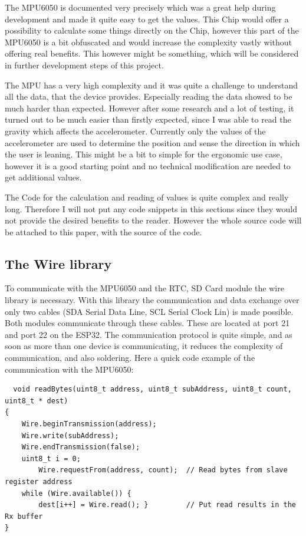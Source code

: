The MPU6050 is documented very precisely which was a great help during development and made it quite easy to get the values. This Chip would offer a possibility to calculate some things directly on the Chip, however this part of the MPU6050 is a bit obfuscated and would increase the complexity vastly without offering real benefits. This however might be something, which will be considered in further development steps of this project.

The MPU has a very high complexity and it was quite a challenge to understand all the data, that the device provides. Especially reading the data showed to be much harder than expected. However after some research and a lot of testing, it turned out to be much easier than firstly expected, since I was able to read the gravity which affects the accelerometer.
Currently only the values of the accelerometer are used to determine the position and sense the direction in which the user is leaning. This might be a bit to simple for the ergonomic use case, however it is a good starting point and no technical modification are needed to get additional values.

The Code for the calculation and reading of values is quite complex and really long. Therefore I will not put any code snippets in this sections since they would not provide the desired benefits to the reader. However the whole source code will be attached to this paper, with the source of the code. \cite{TDKAttra32:online}

\newpage

\subsection{The Wire library}

To communicate with the MPU6050 and the RTC, SD Card module the wire library is necessary. With this library the communication and data exchange over only two cables (SDA Serial Data Line, SCL Serial Clock Lin) is made possible. Both modules communicate through these cables. These are located at port 21 and port 22 on the ESP32. The communication protocol is quite simple, and as soon as more than one device is communicating, it reduces the complexity of communication, and also soldering. Here a quick code example of the communication with the MPU6050:
\begin{lstlisting}
  void readBytes(uint8_t address, uint8_t subAddress, uint8_t count, uint8_t * dest)
{  
	Wire.beginTransmission(address);   
	Wire.write(subAddress);            
	Wire.endTransmission(false);       
	uint8_t i = 0;
        Wire.requestFrom(address, count);  // Read bytes from slave register address 
	while (Wire.available()) {
        dest[i++] = Wire.read(); }         // Put read results in the Rx buffer
}
\end{lstlisting}

